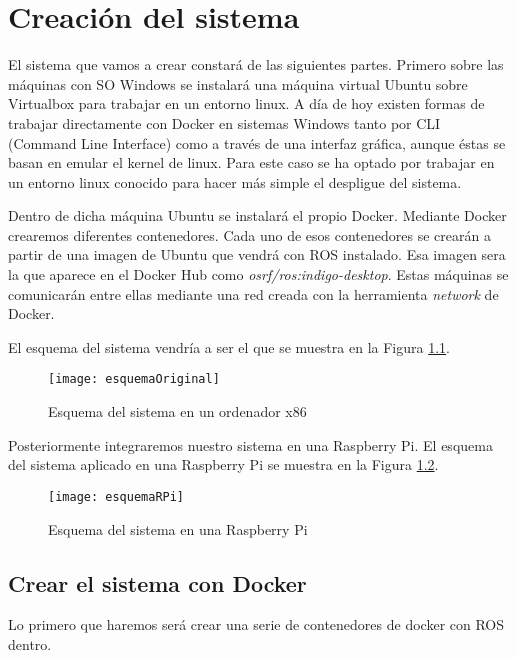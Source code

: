 \chapter{Creación del sistema}

El sistema que vamos a crear constará de las siguientes partes. Primero sobre las máquinas con SO Windows se instalará una máquina virtual Ubuntu sobre Virtualbox para trabajar en un entorno linux. A día de hoy existen formas de trabajar directamente con Docker en sistemas Windows tanto por CLI (Command Line Interface) como a través de una interfaz gráfica, aunque éstas se basan en emular el kernel de linux. Para este caso se ha optado por trabajar en un entorno linux conocido para hacer más simple el despligue del sistema.

Dentro de dicha máquina Ubuntu se instalará el propio Docker. Mediante Docker crearemos diferentes contenedores. Cada uno de esos contenedores se crearán a partir de una imagen de Ubuntu que vendrá con ROS instalado. Esa imagen sera la que aparece en el Docker Hub como \emph{osrf/ros:indigo-desktop}. Estas máquinas se comunicarán entre ellas mediante una red creada con la herramienta \emph{network} de Docker.

El esquema del sistema vendría a ser el que se muestra en la Figura \ref{fig:esquemaOriginal}.
\begin{figure}[H] %
	\centering
	\texttt{[image: esquemaOriginal]}
	\caption{Esquema del sistema en un ordenador x86}
	\label{fig:esquemaOriginal}
\end{figure}

Posteriormente integraremos nuestro sistema en una Raspberry Pi. El esquema del sistema aplicado en una Raspberry Pi se muestra en la Figura \ref{fig:esquemaRPi}.
\begin{figure}[H]
	\centering
	\texttt{[image: esquemaRPi]}
	\caption{Esquema del sistema en una Raspberry Pi}
	\label{fig:esquemaRPi}
\end{figure}

	\section{Crear el sistema con Docker}
	Lo primero que haremos será crear una serie de contenedores de docker con ROS dentro.
	
